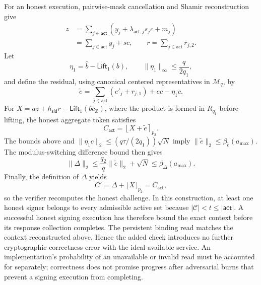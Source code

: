 \documentclass[lettersize,journal]{IEEEtran}
\begin{document}
For an honest execution, pairwise-mask cancellation and Shamir reconstruction
give
\[
\begin{aligned}
z
&=
\sum_{j\in\mathsf{act}}
\left(y_j+\lambda_{\mathsf{act},j}s_jc+m_j\right)\\
&=
\sum_{j\in\mathsf{act}}y_j+sc,
\qquad
r=\sum_{j\in\mathsf{act}}r_{j,2}.
\end{aligned}
\]
Let
\[
\eta_1
=
\widehat b-\mathsf{Lift}_1(b),
\qquad
\|\eta_1\|_\infty\leq\frac{q}{2q_1},
\]
and define the residual, using canonical centered representatives in
$\mathcal M_q$, by
\[
\widetilde e
=
\sum_{j\in\mathsf{act}}(e'_j+r_{j,1})
+ec-\eta_1c.
\]
For
$X=az+h_{\mathsf{sid}}r-\mathsf{Lift}_1(bc_{\mathbb Z})$, where the product
is formed in $R_{q_1}$ before lifting, the honest aggregate token
satisfies
\[
C_{\mathsf{act}}
=
\left\lfloor X+\widetilde e\right\rceil_{p_2}.
\]
The bounds above and
$\|\eta_1c\|_2\leq(q\tau/(2q_1))\sqrt N$ imply
$\|\widetilde e\|_2\leq\beta_{\widetilde e}(a_{\max})$. The modulus-switching
difference bound then gives
\[
\|\Delta\|_2
\leq
\frac{q_2}{q}\|\widetilde e\|_2+\sqrt N
\leq
\beta_\Delta(a_{\max}).
\]
Finally, the definition of $\Delta$ yields
\[
C'
=
\Delta+\lfloor X\rceil_{p_2}
=
C_{\mathsf{act}},
\]
so the verifier recomputes the honest challenge.
In this construction, at least one honest signer belongs to every admissible active
set because $|\mathcal C|<t\leq|\mathsf{act}|$. A successful honest signing
execution has therefore bound the exact context before its response
collection completes. The persistent binding read matches the context
reconstructed above. Hence the added check introduces no further
cryptographic correctness error with the ideal available service.
An implementation's probability of an unavailable or invalid read must be
accounted for separately; correctness does not promise progress after
adversarial burns that prevent a signing execution from completing.
\end{document}

